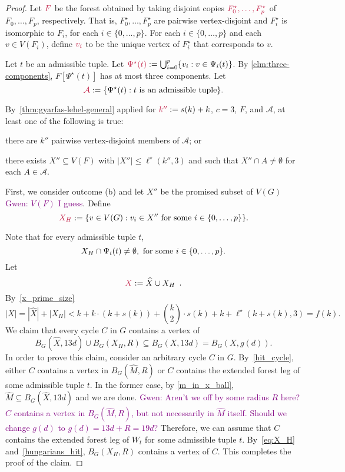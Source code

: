 \documentclass{patmorin}
\newcommand{\gwen}[1]{\textcolor{Purple}{Gwen: #1}}
\DeclarePairedDelimiter\set{\{}{\}}
\begin{document}
\begin{proof}
Let $\mathdefin{F}$ be the forest obtained by taking 
disjoint copies $\mathdefin{F_0^\star,\ldots, F_p^\star}$ of $F_0,\ldots, F_p$, respectively.  That is,  $F_0^\star,\ldots, F_p^\star$ are pairwise vertex-disjoint and $F_i^\star$ is isomorphic to $F_i$, for each $i\in\{0,\ldots,p\}$.
For each $i\in\{0,\ldots,p\}$ and each $v\in V(F_i)$, define $\mathdefin{v_i}$ to be the unique vertex of $F^\star_i$ that corresponds to $v$.

Let $t$ be an admissible tuple. 
Let $\mathdefin{\Psi^\star(t)}:=\bigcup_{i=0}^p \{v_i:v\in \Psi_i(t)\}$.
By \cref{clm:three-components}, $F[\Psi^\star(t)]$ has at most three components. 
Let
\[
\mathdefin{\mathcal{A}}:=\{\Psi^\star(t):\text{$t$ is an admissible tuple}\}.
\]

By~\cref{thm:gyarfas-lehel-general} applied for
$\mathdefin{k''}:=s(k)+k$, $c=3$, $F$, and $\mathcal{A}$, at least one of the following is true:
\begin{enumerate*}[label=(\alph*),ref=\alph*]
  \item there are $k''$ pairwise vertex-disjoint members of $\mathcal{A}$; or 
  \item there exists $X''\subseteq V(F)$ with $|X''|\leq \ell^\star(k'',3)$ and such that $X'' \cap A\neq\emptyset$ for each $A\in \mathcal{A}$.
\end{enumerate*}

First, we consider outcome (b) and let $X''$ be the promised subset of $V(G)$ \gwen{$V(F)$ I guess}.
Define 
\[
\mathdefin{X_H}:=\set{v\in V(G):v_i\in X'' \textrm{ for some $i\in\set{0,\ldots,p}$}}.
\]


Note that 
for every admissible tuple $t$,
\begin{equation}\label{eq:X_H}
X_H \cap \Psi_i(t) \neq\emptyset,\ \textrm{for some $i\in\set{0,\ldots,p}$.}
\end{equation}
Let
\[
\mathdefin{X}:=\widehat{X} \cup X_H \enspace .
\]
By~\eqref{x_prime_size}
\[
|X| = |\widehat{X}| + |X_H| < \textstyle k + k\cdot (k+s(k)) + \binom{k}{2}\cdot s(k) + k + \ell^\star(k+s(k),3) = f(k).
\]
We claim that every cycle $C$ in $G$ contains a vertex of 
\[
B_G(\widehat{X},13d)\cup B_G(X_H,R)\subseteq B_G(X,13d) = B_G(X,g(d)).
\]
In order to prove this claim, consider an arbitrary cycle $C$ in $G$. 
By~\cref{hit_cycle}, either $C$ contains a vertex in $B_G(\widehat{M},R)$ or $C$ contains the extended forest leg of some admissible tuple $t$. 
In the former case, by \eqref{m_in_x_ball}, $\widehat{M}\subseteq B_G(\widehat{X},13d)$ and we are done. 
\gwen{Aren't we off by some radius $R$ here? $C$ contains a vertex in $B_G(\widehat{M},R)$, but not necessarily in $\widehat{M}$ itself. Should we change $g(d)$ to $g(d)=13d+R=19d$?}
Therefore, we can assume that $C$ contains the extended forest leg of $W_t$ for some admissible tuple $t$. 
By~\eqref{eq:X_H} and~\cref{hungarians_hit}, 
$B_G(X_H,R)$ contains a vertex of $C$.
This completes the proof of the claim.


\end{proof}
\end{document}
